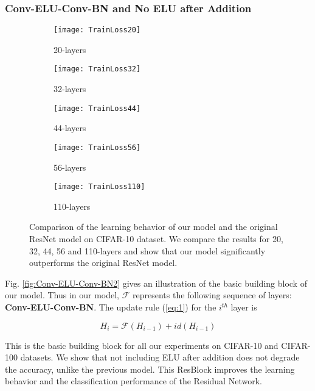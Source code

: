 \documentclass[10pt,twocolumn,letterpaper]{article}
\begin{document}
\subsubsection{Conv-ELU-Conv-BN and No ELU after Addition}

\begin{figure*}
    \centering
    \begin{subfigure}{.33\linewidth}
        \centering
        \texttt{[image: TrainLoss20]}
        \caption{20-layers}
        \label{fig:Cifar10TrainLoss20}
    \end{subfigure}
    \begin{subfigure}{.33\linewidth}
        \centering
        \texttt{[image: TrainLoss32]}
        \caption{32-layers}
        \label{fig:Cifar10TrainLoss32}
    \end{subfigure}
    \begin{subfigure}{.33\linewidth}
        \centering
        \texttt{[image: TrainLoss44]}
        \caption{44-layers}
        \label{fig:Cifar10TrainLoss44}
    \end{subfigure}
    \begin{subfigure}{.4\linewidth}
        \centering
        \texttt{[image: TrainLoss56]}
        \caption{56-layers}
        \label{fig:Cifar10TrainLoss56}
    \end{subfigure}
    \begin{subfigure}{.4\linewidth}
        \centering
        \texttt{[image: TrainLoss110]}
        \caption{110-layers}
        \label{fig:Cifar10TrainLoss110}
    \end{subfigure}
    \caption{Comparison of the learning behavior of our model and the original ResNet model on CIFAR-10 dataset. We compare the results for 20, 32, 44, 56 and 110-layers and show that our model significantly outperforms the original ResNet model.}
    \label{fig:Cifar10TrainLoss}
\end{figure*}

Fig. \ref{fig:Conv-ELU-Conv-BN2} gives an illustration of the basic building block of our model. Thus in our model, \(\mathcal{F}\) represents the following sequence of layers: \textbf{Conv-ELU-Conv-BN}. The update rule (\ref{eq:1}) for the \(i^{th}\) layer is 

\begin{equation} \label{eq:2}
 H_i = \mathcal{F}(H_{i-1}) + id(H_{i-1})
\end{equation}

This is the basic building block for all our experiments on CIFAR-10 and CIFAR-100 datasets. We show that not including ELU after addition does not degrade the accuracy, unlike the previous model. This ResBlock improves the learning behavior and the classification performance of the Residual Network. 
\end{document}
